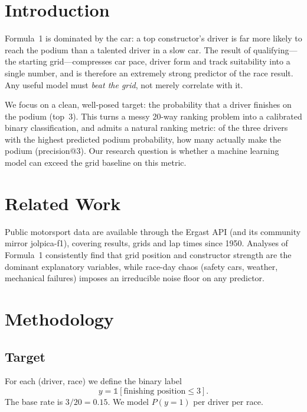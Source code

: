 \documentclass[10pt,twocolumn]{article}
\begin{document}
\section{Introduction}
Formula~1 is dominated by the car: a top constructor's driver is far more likely
to reach the podium than a talented driver in a slow car. The result of
qualifying---the starting grid---compresses car pace, driver form and track
suitability into a single number, and is therefore an extremely strong predictor
of the race result. Any useful model must \emph{beat the grid}, not merely
correlate with it.

We focus on a clean, well-posed target: the probability that a driver finishes
on the podium (top~3). This turns a messy 20-way ranking problem into a
calibrated binary classification, and admits a natural ranking metric: of the
three drivers with the highest predicted podium probability, how many actually
make the podium (precision@3). Our research question is whether a machine
learning model can exceed the grid baseline on this metric.

\section{Related Work}
Public motorsport data are available through the Ergast API (and its community
mirror jolpica-f1), covering results, grids and lap times since 1950. Analyses of
Formula~1 consistently find that grid position and constructor strength are the
dominant explanatory variables, while race-day chaos (safety cars, weather,
mechanical failures) imposes an irreducible noise floor on any predictor.

\section{Methodology}

\subsection{Target}
For each (driver, race) we define the binary label
\begin{equation}
  y = \mathbb{1}[\text{finishing position} \le 3].
\end{equation}
The base rate is $3/20 = 0.15$. We model $P(y=1)$ per driver per race.
\end{document}
